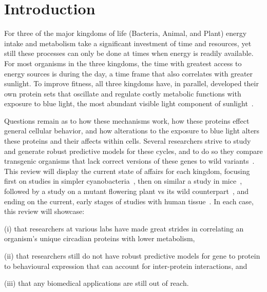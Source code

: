 \documentclass [12pt]{article}
\begin{document}
\section{Introduction}
\indent For three of the major kingdoms of life (Bacteria, Animal, and Plant) energy intake and metabolism take a significant investment of time and resources, yet still these processes can only be done at times when energy is readily available. For most organisms in the three kingdoms, the time with greatest access to energy sources is during the day, a time frame that also correlates with greater sunlight. To improve fitness, all three kingdoms have, in parallel, developed their own protein sets that oscillate and regulate costly metabolic functions with exposure to blue light, the most abundant visible light component of sunlight~\autocite{Cohen2015}. \par
Questions remain as to how these mechanisms work, how these proteins effect general cellular behavior, and how alterations to the exposure to blue light alters these proteins and their affects within cells. Several researchers strive to study and generate robust predictive models for these cycles, and to do so they compare transgenic organisms that lack correct versions of these genes to wild variants~\autocite{Kepsutlu2014}. This review will display the current state of affairs for each kingdom, focusing first on studies in simpler cyanobacteria~\autocite{Tseng2014}, then on similar a study in mice~\autocite{Yamajuku2011}, followed by a study on a mutant flowering plant vs its wild counterpart~\autocite{Kim2008}, and ending on the current, early stages of studies with human tissue~\autocite{Keller2009}. In each case, this review will showcase: \par (i) that researchers at various labs have made great strides in correlating an organism's unique circadian proteins with lower metabolism, \par (ii) that researchers still do not have robust predictive models for gene to protein to behavioural expression that can account for inter-protein interactions, and \par (iii) that any biomedical applications are still out of reach.
\newpage
\end{document}
